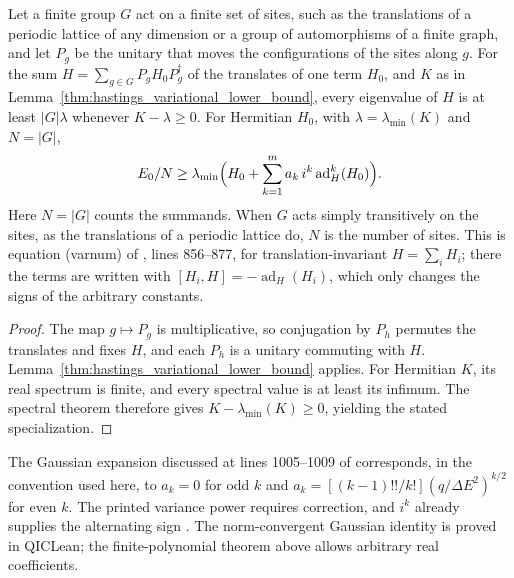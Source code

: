 \begin{lemma}
    \label{thm:hastings_variational_lower_bound_sites}
    \leanok
    Let a finite group $G$ act on a finite set of sites, such as the
    translations of a periodic lattice of any dimension or a group of
    automorphisms of a finite graph, and let $P_g$ be the unitary that moves the
    configurations of the sites along $g$. For the sum
    $H=\sum_{g\in G}P_gH_0P_g^\dagger$ of the translates of one term $H_0$, and
    $K$ as in Lemma~\ref{thm:hastings_variational_lower_bound}, every
    eigenvalue of $H$ is at least $|G|\lambda$ whenever $K-\lambda\ge0$. For
    Hermitian $H_0$, with $\lambda=\lambda_{\min}(K)$ and $N=|G|$,
    \begin{align}
        E_0/N\ge\lambda_{\min}\Bigl(H_0+\sum_{k=1}^ma_k\,i^k
        \operatorname{ad}_H^k(H_0)\Bigr).
    \end{align}
    Here $N=|G|$ counts the summands. When $G$ acts simply transitively on the
    sites, as the translations of a periodic lattice do, $N$ is the number of
    sites. This is equation (varnum) of \cite{Hastings2006Solving}, lines
    856--877, for translation-invariant $H=\sum_iH_i$; there the terms are
    written with $[H_i,H]=-\operatorname{ad}_H(H_i)$, which only changes the
    signs of the arbitrary constants.
\end{lemma}
\begin{proof}\leanok
    The map $g\mapsto P_g$ is multiplicative, so conjugation by $P_h$ permutes
    the translates and fixes $H$, and each $P_h$ is a unitary commuting with $H$.
    Lemma~\ref{thm:hastings_variational_lower_bound} applies. For Hermitian
    $K$, its real spectrum is finite, and every spectral value is at least
    its infimum. The spectral theorem therefore gives
    $K-\lambda_{\min}(K)\ge0$, yielding the stated specialization.
\end{proof}

The Gaussian expansion discussed at lines 1005--1009 of
\cite{Hastings2006Solving} corresponds, in the convention used here, to
$a_k=0$ for odd $k$ and
$a_k=[(k-1)!!/k!](q/\Delta E^2)^{k/2}$ for even $k$. The printed variance
power requires correction, and $i^k$ already supplies the alternating sign
\cite{gap:hastings05_gaussian_series_coefficients}. The norm-convergent Gaussian
identity is proved in QICLean; the finite-polynomial theorem above allows
arbitrary real coefficients.

